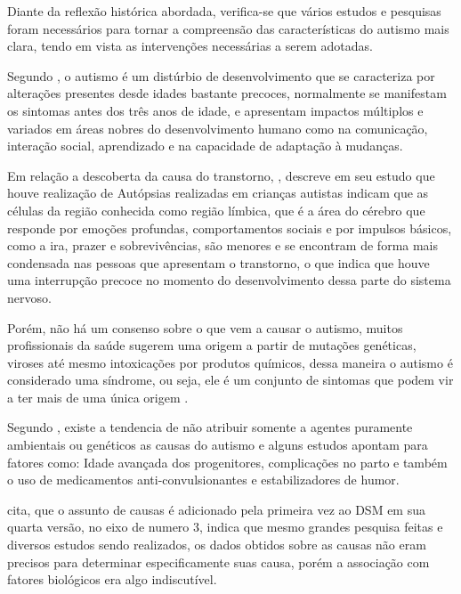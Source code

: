 		Diante da reflexão histórica abordada, verifica-se que vários estudos e pesquisas foram necessários para tornar a compreensão das características do autismo mais clara, tendo em vista as intervenções necessárias a serem adotadas. 
	
		Segundo , o autismo é um distúrbio de desenvolvimento que se caracteriza por alterações presentes desde idades bastante precoces, normalmente se manifestam os sintomas antes dos três anos de idade, e apresentam impactos múltiplos e variados em áreas nobres do desenvolvimento humano como na comunicação, interação social, aprendizado e na capacidade de adaptação à mudanças.
		
		Em relação a descoberta da causa do transtorno, , descreve em seu estudo que houve realização de Autópsias realizadas em crianças autistas indicam que as células da região conhecida como região límbica, que é a área do cérebro que responde por emoções profundas, comportamentos sociais e por impulsos básicos, como a ira, prazer e sobrevivências, são menores e se encontram de forma mais condensada nas pessoas que apresentam o transtorno, o que indica que houve uma interrupção precoce no momento do desenvolvimento dessa parte do sistema nervoso.
		
		Porém, não há um consenso sobre o que vem a causar o autismo, muitos profissionais da saúde sugerem uma origem a partir de mutações genéticas, viroses até mesmo intoxicações por produtos químicos, dessa maneira o autismo é considerado uma síndrome, ou seja, ele é um conjunto de sintomas que podem vir a ter mais de uma única origem \cite{alcantara2013autismo}.

		Segundo , existe a tendencia de não atribuir somente a agentes puramente ambientais ou genéticos as causas do autismo e alguns estudos apontam para fatores como: Idade avançada dos progenitores, complicações no parto e também o uso de medicamentos anti-convulsionantes e estabilizadores de humor.
		
		 cita, que o assunto de causas é adicionado pela primeira vez ao DSM em sua quarta versão, no eixo de numero 3, indica que mesmo grandes pesquisa feitas e diversos estudos sendo realizados, os dados obtidos sobre as causas não eram precisos para determinar especificamente suas causa, porém a associação com fatores biológicos era algo indiscutível.
		
